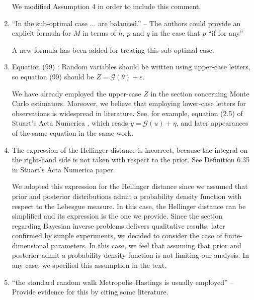 \documentclass[10pt]{article}
\begin{document}
\begin{enumerate}
\begin{itquote}
	\end{itquote}
	We modified Assumption 4 in order to include this comment.
	\item 
	\begin{itquote}{}
	``In the sub-optimal case ... are balanced.'' -- The authors could provide an explicit formula for $M$ in terms of $h$, $p$ and $q$ in the case that $p$ ``if for any''
	\end{itquote}
	A new formula has been added for treating this sub-optimal case.
	\item 
	\begin{itquote}
		Equation (99) {}: Random variables should be written using upper-case letters, so equation (99) should be $Z=\mathcal{G}(\theta)+\varepsilon$.
	\end{itquote}
	We have already employed the upper-case $Z$ in the section concerning Monte Carlo estimators. Moreover, we believe that employing lower-case letters for observations is widespread in literature. See, for example, equation (2.5) of Stuart's Acta Numerica \cite{Stu10}, which reads $y = \mathcal G(u) + \eta$, and later appearances of the same equation in the same work.
	\item 
	\begin{itquote}
		{\normalfont [Equation (103)]} The expression of the Hellinger distance is incorrect, because the integral on the right-hand side is not taken with respect to the prior. See Definition 6.35 in Stuart's Acta Numerica paper.
	\end{itquote}
	We adopted this expression for the Hellinger distance since we assumed that prior and posterior distributions admit a probability density function with respect to the Lebesgue measure. In this case, the Hellinger distance can be simplified and its expression is the one we provide. Since the section regarding Bayesian inverse problems delivers qualitative results, later confirmed by simple experiments, we decided to consider the case of finite-dimensional parameters. In this case, we feel that assuming that prior and posterior admit a probability density function is not limiting our analysis. In any case, we specified this assumption in the text.
	\item 
	\begin{itquote}
		{} ``the standard random walk Metropolis--Hastings is usually employed'' -- Provide evidence for this by citing some literature.
	\end{itquote}

\end{enumerate}
\end{document}
